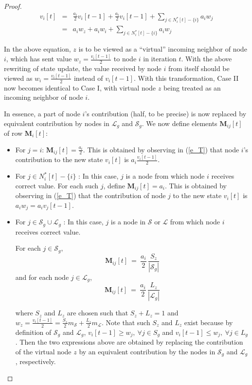 \documentclass{llncs}
\newcommand{\scriptl}{\mathcal{L}}
\newcommand{\scripts}{\mathcal{S}}
\newcommand{\matrixm}{\textbf{M}}
\begin{document}
\begin{proof}
\begin{eqnarray}
v_i[t] & = & \frac{a_i}{2} v_i[t-1]  + \frac{a_i}{2} v_i[t-1]
	+ \sum_{j\in N_i^*[t] - \{i\}} a_iw_j \\
& = & a_iw_z + a_i w_i
	+ \sum_{j\in N_i^*[t] - \{i\}} a_iw_j 
\end{eqnarray}

In the above equation, $z$ is to be viewed as a ``virtual'' incoming
neighbor of node $i$, which has sent value $w_z=\frac{v_i[t-1]}{2}$
to node $i$ in iteration $t$.
With the above rewriting of state update,
the value received by node $i$ from itself should
be viewed as $w_i=\frac{v_i[t-1]}{2}$ instead of $v_i[t-1]$. 
With this transformation, Case II now becomes identical
to Case I, with virtual node $z$ being treated
as an incoming neighbor of node $i$.


In essence, a part of node $i$'s contribution (half, to be precise) is now replaced by equivalent contribution by nodes in $\scriptl_g$ and $\scripts_g$. 
We now define elements $\matrixm_{ij}[t]$ of row $\matrixm_i[t]$:

\begin{itemize}
\item For $j = i$: $\matrixm_{ij}[t] = \frac{a_i}{2}$. This is obtained by observing in (\ref{e_T}) that node $i$'s contribution to the new state $v_i[t]$ is $a_i\frac{v_i[t-1]}{2}$.


\item For $j \in N_i^*[t] - \{i\}$ : In this case, $j$ is a node from which node $i$ receives correct value. For each such $j$, define $\matrixm_{ij}[t] = a_i$. This is obtained by observing in (\ref{e_T}) that the contribution of node $j$ to the new state $v_i[t]$ is $a_iw_j = a_i v_j[t - 1]$.


\item For $j\in \scripts_g \cup \scriptl_g$ : In this case, $j$ is a node in $\scripts$ or  $\scriptl$ from which node $i$ receives correct value. 

For each $j \in \scripts_g$,
\[
\matrixm_{ij}[t] ~=~ \frac{a_i}{2} \, \frac{S_z}{|\scripts_g|}
\]
and for each node $j \in \scriptl_g$,
\[
\matrixm_{ij}[t] ~=~ \frac{a_i}{2} \, \frac{L_z}{|\scriptl_g|}
\]

where $S_z$ and $L_z$ are chosen such that $S_z + L_z = 1$ and $w_z = \frac{v_i[t-1]}{2} = \frac{S_z}{2} m_{\scripts} + \frac{L_z}{2} m_{\scriptl}$. Note that such $S_z$ and $L_z$ exist because by definition of $\scripts_g$ and $\scriptl_g$, $v_i[t-1] \geq w_j,~\forall j \in S_g$ and $v_i[t-1] \leq w_j,~\forall j \in L_g$. Then the two expressions above are obtained by replacing the contribution of the virtual node $z$ by an equivalent contribution by the nodes in $\scripts_g$ and $\scriptl_g$, respectively.


\end{itemize}
\end{proof}
\end{document}
